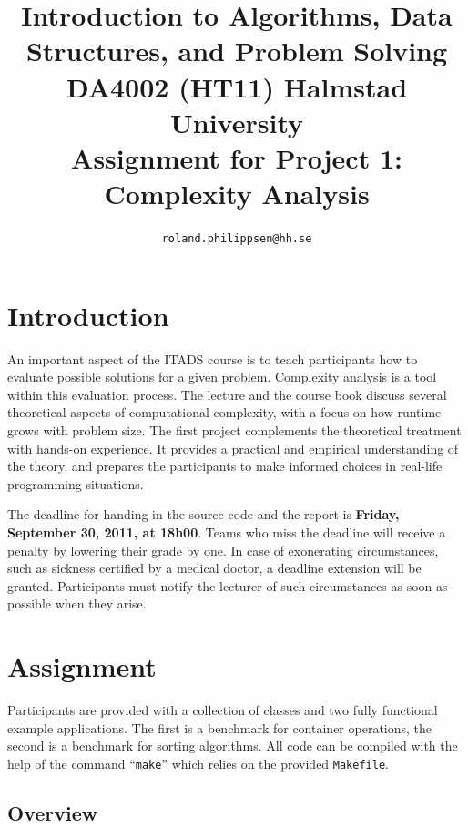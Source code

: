 \documentclass[a4paper,10pt]{article}
\begin{document}
\title{
  {\normalsize
    Introduction to Algorithms, Data Structures, and Problem Solving\\
    DA4002 (HT11) Halmstad University}\\
  Assignment for Project 1: Complexity Analysis\\
}
\author{
  \texttt{roland.philippsen@hh.se}
}
\maketitle



\section{Introduction}

An important aspect of the ITADS course is to teach participants how to evaluate possible solutions for a given problem.
Complexity analysis is a tool within this evaluation process.
The lecture and the course book discuss several theoretical aspects of computational complexity, with a focus on how runtime grows with problem size.
The first project complements the theoretical treatment with hands-on experience.
It provides a practical and empirical understanding of the theory, and prepares the participants to make informed choices in real-life programming situations.

The deadline for handing in the source code and the report is \textbf{Friday, September 30, 2011, at 18h00}.
Teams who miss the deadline will receive a penalty by lowering their grade by one.
In case of exonerating circumstances, such as sickness certified by a medical doctor, a deadline extension will be granted.
Participants must notify the lecturer of such circumstances as soon as possible when they arise.



\section{Assignment}

Participants are provided with a collection of classes and two fully functional example applications.
The first is a benchmark for container operations, the second is a benchmark for sorting algorithms.
All code can be compiled with the help of the command ``\texttt{make}'' which relies on the provided \texttt{Makefile}.



\subsection{Overview}
\end{document}
